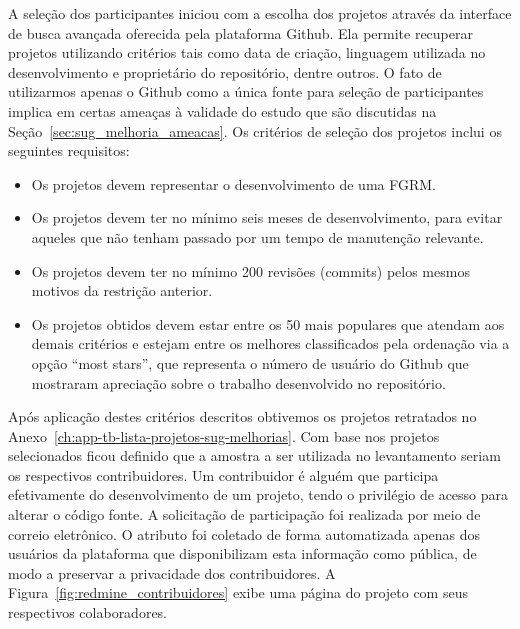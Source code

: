 A seleção dos participantes iniciou com a escolha dos projetos através da
interface de busca avançada oferecida pela plataforma Github. Ela permite
recuperar projetos utilizando critérios tais como data de criação, linguagem
utilizada no desenvolvimento e proprietário do repositório, dentre outros. O
fato de utilizarmos apenas o Github como a única fonte para seleção de
participantes implica em certas ameaças à validade do estudo que são discutidas
na Seção~\ref{sec:sug_melhoria_ameacas}. Os critérios de seleção dos projetos
inclui os seguintes requisitos:

\begin{itemize}
	\item Os projetos devem representar o desenvolvimento de uma FGRM\@.
    \item Os projetos devem ter no mínimo seis meses de desenvolvimento, para
        evitar aqueles que não tenham passado por um tempo de manutenção
        relevante.
	\item Os projetos devem  ter  no  mínimo  200  revisões (commits)  pelos
		mesmos motivos  da restrição anterior.
    \item Os projetos obtidos devem estar entre os 50 mais populares que atendam
        aos demais critérios e estejam entre os melhores classificados pela
        ordenação via a opção ``most stars'', que representa o número de usuário
        do Github que mostraram apreciação sobre o trabalho desenvolvido no
        repositório.
\end{itemize}

Após aplicação destes critérios descritos obtivemos os projetos retratados no
Anexo~\ref{ch:app-tb-lista-projetos-sug-melhorias}. Com base nos projetos
selecionados ficou definido que a amostra a ser utilizada no levantamento seriam
os respectivos contribuidores. Um contribuidor é alguém que participa
efetivamente do desenvolvimento de um projeto, tendo o privilégio de acesso para
alterar o código fonte. A solicitação de participação foi realizada por meio de
correio eletrônico. O atributo foi coletado de forma automatizada apenas dos
usuários da plataforma que disponibilizam esta informação como pública, de modo
a preservar a privacidade dos contribuidores. A
Figura~\ref{fig:redmine_contribuidores} exibe uma página do projeto com seus
respectivos colaboradores.

